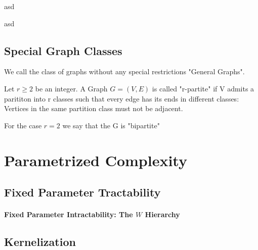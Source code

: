 \begin{definition}
    asd
\end{definition}

\begin{definition}
    asd
\end{definition}

\subsection*{Special Graph Classes}
We call the class of graphs without any special restrictions "General Graphs".

\begin{definition}
    Let $r \geq 2$ be an integer. A Graph $G = (V,E)$ is called "r-partite" if V admits a parititon into r classes such that every edge has its ends in different classes: Vertices in the same partition class must not be adjacent. 
    
    For the case $r = 2$ we say that the G is "bipartite" 

\end{definition}

\begin{definition}
    
\end{definition}

\begin{definition}
    
\end{definition}


\section{Parametrized Complexity}

\subsection{Fixed Parameter Tractability}
\paragraph{Fixed Parameter Intractability: The \hmath $W$ Hierarchy}
\subsection{Kernelization}


